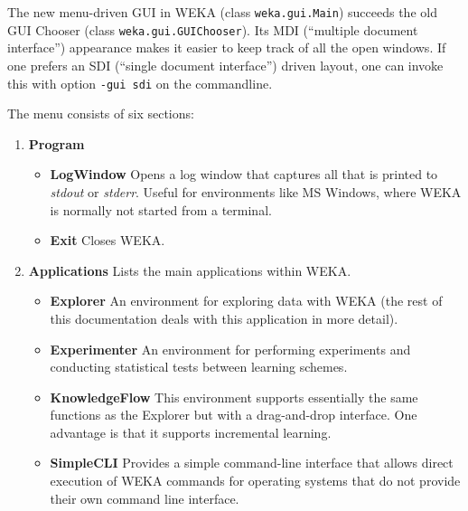 
The new menu-driven GUI in WEKA (class \texttt{weka.gui.Main}) succeeds the old GUI Chooser (class \texttt{weka.gui.GUIChooser}). Its MDI (``multiple document interface'') appearance makes it easier to keep track of all the open windows. If one prefers an SDI (``single document interface'') driven layout, one can invoke this with option \texttt{-gui sdi} on the commandline.

\begin{center}
\end{center}

The menu consists of six sections:

\begin{enumerate}
	\item \textbf{Program} \\
		\begin{itemize}
			\item \textbf{LogWindow} Opens a log window that captures all that is printed to \textit{stdout} or \textit{stderr}. Useful for environments like MS Windows, where WEKA is normally not started from a terminal.
			\item \textbf{Exit} Closes WEKA.
		\end{itemize}
		
	\item \textbf{Applications} Lists the main applications within WEKA. \\
		\begin{itemize}
			\item \textbf{Explorer} An environment for exploring data with
WEKA (the rest of this documentation deals with this application in more detail).
			\item \textbf{Experimenter} An environment for performing experiments and conducting statistical tests
between learning schemes.
			\item \textbf{KnowledgeFlow} This environment supports essentially
the same functions as the Explorer but with a drag-and-drop
interface. One advantage is that it supports incremental learning.
			\item \textbf{SimpleCLI} Provides a simple command-line interface
that allows direct execution of WEKA commands for operating systems
that do not provide their own command line interface.
		\end{itemize}
		

\end{enumerate}
